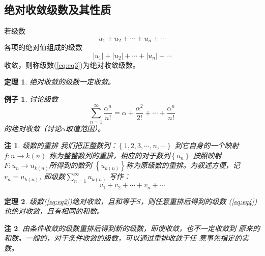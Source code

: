 \documentclass[a4paper,12pt]{article}
\newtheorem{theorem}{定理}
\newtheorem{example}{例子}
\newtheorem{remark}{注}
\let\oldref\ref
\renewcommand{\ref}[1]{\rm{(\oldref{#1})}}
\begin{document}
\subsection{绝对收敛级数及其性质}
若级数
\begin{equation}
    u_1 + u_2 + \cdots + u_n + \cdots 
    \label{eq:eq2}
\end{equation}
各项的绝对值组成的级数
\begin{equation}
    \left| u_1 \right| + \left| u_2 \right| + \cdots + \left| u_n \right| + \cdots 
    \label{eq:eq3}
\end{equation}
收敛，则称级数\ref{eq:eq3}为绝对收敛级数。

\begin{theorem}
    绝对收敛的级数一定收敛。
\end{theorem}

\begin{example}
    讨论级数
    \[
        \sum_{n=1}^{\infty} \frac{\alpha^n}{n!} = \alpha + \frac{\alpha^2}{2!} + \cdots +
        \frac{\alpha^n}{n!}
        \]
    的绝对收敛（讨论$\alpha$取值范围）。
\end{example}

\begin{remark}{\rm 级数的重排}
    我们把正整数列：$\displaystyle \left\{1, 2, 3, \cdots, n, \cdots\right\}$
    到它自身的一个映射$\displaystyle f: n \to k(n)$
    称为整整数列的重排，相应的对于数列$\displaystyle \left\{u_n\right\} $
    按照映射$\displaystyle F: u_n \to u_{k(n)}$所得到的数列
    $\displaystyle \left\{u_{k(n)}\right\}$称为原级数的重排。为叙述方便，记
    $\displaystyle v_n = u_{k(n)}$, 即级数$\displaystyle \sum_{n=1}^{\infty} u_{k(n)}$
    写作：
    \begin{equation}
        v_1 + v_2 + \cdots + v_n + \cdots
        \label{eq:eq4}
    \end{equation}
\end{remark}
\begin{theorem}
    级数\ref{eq:eq2}绝对收敛，且和等于$S$，则任意重排后得到的级数
    \ref{eq:eq4}也绝对收敛，且有相同的和数。
\end{theorem}

\begin{remark}
    由条件收敛的级数重排后得到新的级数，即使收敛，也不一定收敛到
    原来的和数。一般的，对于条件收敛的级数，可以通过重排收敛于任
    意事先指定的实数。
\end{remark}
\end{document}
